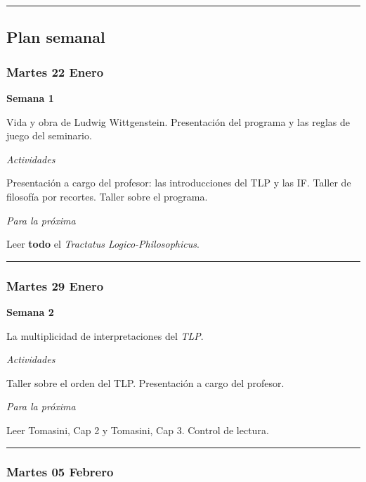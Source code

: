 \documentclass[spanish,]{article}
\begin{document}
\begin{center}\rule{0.5\linewidth}{\linethickness}\end{center}

\subsection{Plan semanal}\label{plan-semanal}

\subsubsection{Martes 22 Enero}\label{martes-22-enero}

\textbf{Semana 1}

Vida y obra de Ludwig Wittgenstein. Presentación del programa y las
reglas de juego del seminario.

\emph{Actividades}

Presentación a cargo del profesor: las introducciones del TLP y las IF.
Taller de filosofía por recortes. Taller sobre el programa.

\emph{Para la próxima}

Leer \textbf{todo} el \emph{Tractatus Logico-Philosophicus}.

\begin{center}\rule{0.5\linewidth}{\linethickness}\end{center}

\subsubsection{Martes 29 Enero}\label{martes-29-enero}

\textbf{Semana 2}

La multiplicidad de interpretaciones del \emph{TLP}.

\emph{Actividades}

Taller sobre el orden del TLP. Presentación a cargo del profesor.

\emph{Para la próxima}

Leer Tomasini, Cap 2 y Tomasini, Cap 3. Control de lectura.

\begin{center}\rule{0.5\linewidth}{\linethickness}\end{center}

\subsubsection{Martes 05 Febrero}\label{martes-05-febrero}
\end{document}
